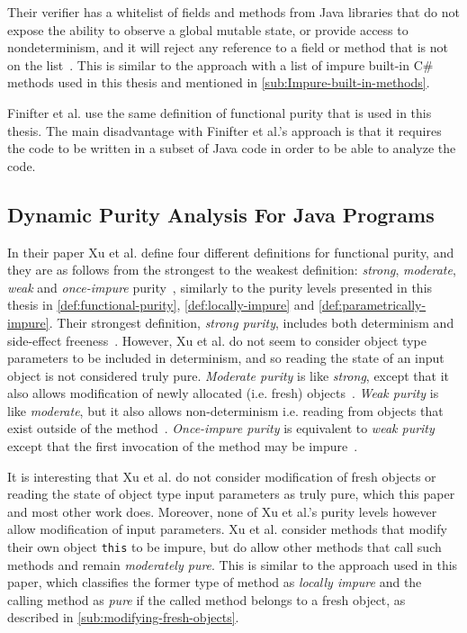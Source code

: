\documentclass[a4paper,12pt]{article}
\begin{document}
Their verifier has a whitelist of fields and methods from Java libraries that do not expose the ability to observe a global mutable state, or provide access to nondeterminism, and it will reject any reference to a field or method that is not on the list~\cite{purity-in-java}. This is similar to the approach with a list of impure built-in C\# methods used in this thesis and mentioned in \autoref{sub:Impure-built-in-methods}.

Finifter et al. use the same definition of functional purity that is used in this thesis. The main disadvantage with Finifter et al.'s approach is that it requires the code to be written in a subset of Java code in order to be able to analyze the code.

\subsection{Dynamic Purity Analysis For Java Programs} \label{sub:Dynamic Purity Analysis For Java Programs}
In their paper Xu et al. define four different definitions for functional purity, and they are as follows from the strongest to the weakest definition: \textit{strong}, \textit{moderate}, \textit{weak} and \textit{once-impure} purity~\cite{xu2007dynamic}, similarly to the purity levels presented in this thesis in \autoref{def:functional-purity}, \autoref{def:locally-impure} and \autoref{def:parametrically-impure}. Their strongest definition, \textit{strong purity}, includes both determinism and side-effect freeness~\cite{xu2007dynamic}. However, Xu et al. do not seem to consider object type parameters to be included in determinism, and so reading the state of an input object is not considered truly pure. \textit{Moderate purity} is like \textit{strong}, except that it also allows modification of newly allocated (i.e. fresh) objects~\cite{xu2007dynamic}. \textit{Weak purity} is like \textit{moderate}, but it also allows non-determinism i.e. reading from objects that exist outside of the method~\cite{xu2007dynamic}. \textit{Once-impure purity} is equivalent to \textit{weak purity} except that the first invocation of the method may be impure~\cite{xu2007dynamic}.

It is interesting that Xu et al. do not consider modification of fresh objects or reading the state of object type input parameters as truly pure, which this paper and most other work does. Moreover, none of Xu et al.'s purity levels however allow modification of input parameters. Xu et al. consider methods that modify their own object \texttt{this} to be impure, but do allow other methods that call such methods and remain \textit{moderately pure}. This is similar to the approach used in this paper, which classifies the former type of method as \textit{locally impure} and the calling method as \textit{pure} if the called method belongs to a fresh object, as described in \autoref{sub:modifying-fresh-objects}.
\end{document}

